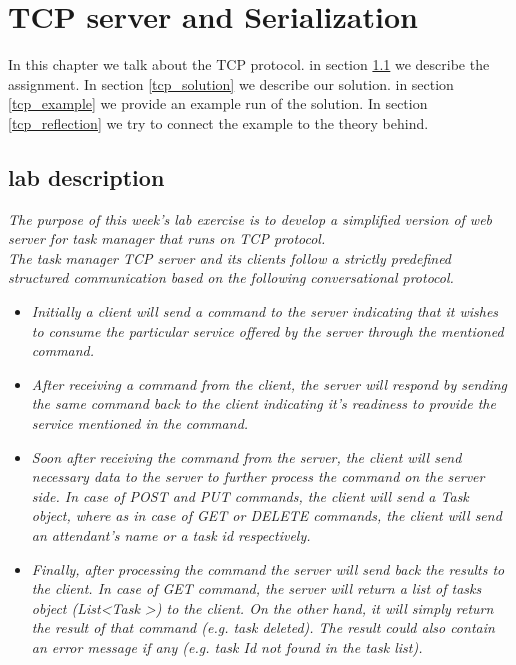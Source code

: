 \chapter{TCP server and Serialization}
\minitoc

In this chapter we talk about the TCP protocol. in section \ref{tcp_lab} we describe the assignment. In section \ref{tcp_solution} we describe our solution. in section \ref{tcp_example} we provide an example run of the solution. In section \ref{tcp_reflection} we try to connect the example to the theory behind. 

\section{lab description}
\label{tcp_lab}
\textit{The purpose of this week's lab exercise is to develop a simplified version of web server for task manager that runs on TCP protocol.}\\

\textit{The task manager TCP server and its clients follow a strictly predefined structured communication based on the following conversational protocol.}

\begin{itemize}
\item \textit{Initially a client will send a command to the server indicating that it wishes to consume the particular service offered by the server through the mentioned command.}\\

\item \textit{After receiving a command from the client, the server will respond by sending the same command back to the client indicating it’s readiness to provide the service mentioned in the command.}\\

\item \textit{Soon after receiving the command from the server, the client will send necessary data to the server to further process the command on the server side. In case of POST and PUT commands, the client will send a Task object, where as in case of GET or DELETE commands, the client will send an attendant's name or a task id respectively.}\\

\item \textit{Finally, after processing the command the server will send back the results to the client. In case of GET command, the server will return a list of tasks object (List\textless Task \textgreater) to the client. On the other hand, it will simply return the result of that command (e.g. task deleted). The result could also contain an error message if any (e.g. task Id not found in the task list).}
\end{itemize}


